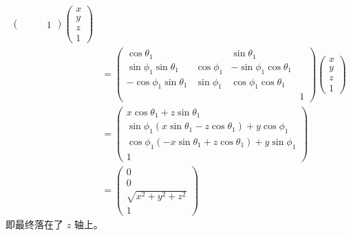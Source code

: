 \documentclass[math-font=newcm]{sjtuarticle}
\begin{document}
\begin{solution}
\begin{align*}
\begin{pmatrix}
            & & & 1
        \end{pmatrix}
        \begin{pmatrix}
            x \\ y \\ z \\ 1
        \end{pmatrix}\\
        &=\begin{pmatrix}
            \cos\theta_1 & & \sin\theta_1 & \\
            \sin\phi_1\sin\theta_1 & \cos\phi_1 & -\sin\phi_1\cos\theta_1 \\
            -\cos\phi_1\sin\theta_1 & \sin\phi_1 & \cos\phi_1\cos\theta_1 \\
            & & & 1
        \end{pmatrix}\begin{pmatrix}
            x \\ y \\ z \\ 1
        \end{pmatrix}\\
        &=\begin{pmatrix}
            x\cos\theta_1+z\sin\theta_1 \\
            \sin\phi_1(x\sin\theta_1-z\cos\theta_1)+y\cos\phi_1\\
            \cos\phi_1(-x\sin\theta_1+z\cos\theta_1)+y\sin\phi_1\\
            1
        \end{pmatrix}\\
        &=\begin{pmatrix}
            0 \\
            0 \\
            \sqrt{x^2+y^2+z^2}\\
            1
        \end{pmatrix}
    \end{align*}
    即最终落在了 $z$ 轴上。
    

\end{solution}
\end{document}
